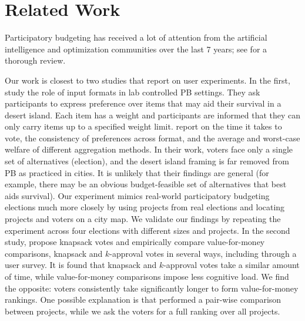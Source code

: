 \documentclass[mnsc,blindrev]{informs3_freeuse} %
\begin{document}
 
\section{Related Work }\label{sec:related}



Participatory budgeting has received a lot of attention from the artificial intelligence and optimization communities over the last 7 years;  see \citet{aziz2021participatory}  for a thorough review.

Our work is closest to two studies that report on user experiments. In the first,  \citet{benade2018efficiency}  study the role of input formats in lab controlled PB settings. They ask participants  to express preference over items that may aid their survival in a desert island. Each item has a weight and participants are informed that they can only carry items up to a specified weight limit. 
\citet{benade2018efficiency} report on the time it takes to vote, the consistency of preferences across format, and the average and worst-case welfare  of different aggregation methods. %
In their work, voters face only a single set of alternatives (election), and the desert island framing is far removed from PB as practiced in cities.  It is unlikely that their findings are general  (for example, there may be an obvious budget-feasible set of alternatives that best aids survival).   Our experiment   mimics real-world participatory budgeting elections much more closely by using projects from real elections and  locating projects and voters on a city map. We   validate our findings by repeating the experiment across four elections with different sizes and projects. 
In the second study, 
\citet{goel2019knapsack} propose knapsack votes and empirically compare       value-for-money comparisons, knapsack and $k$-approval votes in several ways, including through a user survey. It is found that knapsack and $k$-approval votes take a similar amount of time, while value-for-money comparisons impose less cognitive load.  We find the opposite: voters consistently take significantly longer to  form value-for-money rankings. One possible explanation is that \citet{goel2019knapsack} performed a pair-wise comparison between projects, while we ask the voters for a full ranking over all projects. %
\end{document}
